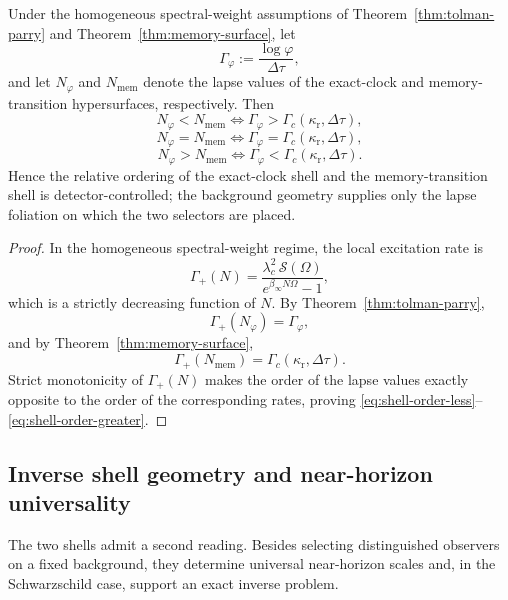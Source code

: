 \begin{theorem}\label{thm:shell-order}
Under the homogeneous spectral-weight assumptions of Theorem~\ref{thm:tolman-parry} and Theorem~\ref{thm:memory-surface}, let
\[
\Gamma_\varphi:=\frac{\log\varphi}{\Delta\tau},
\]
and let $N_\varphi$ and $N_{\mathrm{mem}}$ denote the lapse values of the exact-clock and memory-transition hypersurfaces, respectively. Then
\begin{equation}\label{eq:shell-order-less}
N_\varphi<N_{\mathrm{mem}}
\iff
\Gamma_\varphi>\Gamma_c(\kappa_{\mathrm r},\Delta\tau),
\end{equation}
\begin{equation}\label{eq:shell-order-equal}
N_\varphi=N_{\mathrm{mem}}
\iff
\Gamma_\varphi=\Gamma_c(\kappa_{\mathrm r},\Delta\tau),
\end{equation}
\begin{equation}\label{eq:shell-order-greater}
N_\varphi>N_{\mathrm{mem}}
\iff
\Gamma_\varphi<\Gamma_c(\kappa_{\mathrm r},\Delta\tau).
\end{equation}
Hence the relative ordering of the exact-clock shell and the memory-transition shell is detector-controlled; the background geometry supplies only the lapse foliation on which the two selectors are placed.
\end{theorem}

\begin{proof}
In the homogeneous spectral-weight regime, the local excitation rate is
\[
\Gamma_+(N)
=
\frac{\lambda_c^2\,\mathcal S(\Omega)}{e^{\beta_\infty N\Omega}-1},
\]
which is a strictly decreasing function of $N$. By Theorem~\ref{thm:tolman-parry},
\[
\Gamma_+(N_\varphi)=\Gamma_\varphi,
\]
and by Theorem~\ref{thm:memory-surface},
\[
\Gamma_+(N_{\mathrm{mem}})=\Gamma_c(\kappa_{\mathrm r},\Delta\tau).
\]
Strict monotonicity of $\Gamma_+(N)$ makes the order of the lapse values exactly opposite to the order of the corresponding rates, proving \eqref{eq:shell-order-less}--\eqref{eq:shell-order-greater}.
\end{proof}

\subsection{Inverse shell geometry and near-horizon universality}

The two shells admit a second reading. Besides selecting distinguished observers on a fixed background, they determine universal near-horizon scales and, in the Schwarzschild case, support an exact inverse problem.

